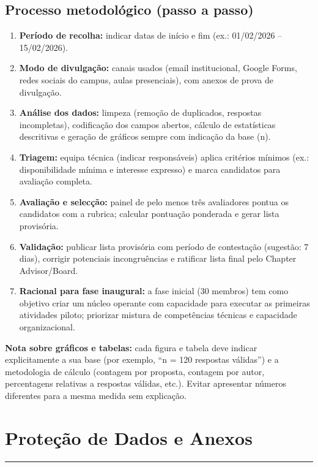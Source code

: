 \documentclass[12pt,a4paper]{article}
\begin{document}
\subsection*{Processo metodológico (passo a passo)}
\begin{enumerate}
    \item \textbf{Período de recolha:} indicar datas de início e fim (ex.: 01/02/2026 -- 15/02/2026).
    \item \textbf{Modo de divulgação:} canais usados (email institucional, Google Forms, redes sociais do campus, aulas presenciais), com anexos de prova de divulgação.
    \item \textbf{Análise dos dados:} limpeza (remoção de duplicados, respostas incompletas), codificação dos campos abertos, cálculo de estatísticas descritivas e geração de gráficos sempre com indicação da base (n).
    \item \textbf{Triagem:} equipa técnica (indicar responsáveis) aplica critérios mínimos (ex.: disponibilidade mínima e interesse expresso) e marca candidatos para avaliação completa.
    \item \textbf{Avaliação e selecção:} painel de pelo menos três avaliadores pontua os candidatos com a rubrica; calcular pontuação ponderada e gerar lista provisória.
    \item \textbf{Validação:} publicar lista provisória com período de contestação (sugestão: 7 dias), corrigir potenciais incongruências e ratificar lista final pelo Chapter Advisor/Board.
    \item \textbf{Racional para fase inaugural:} a fase inicial (30 membros) tem como objetivo criar um núcleo operante com capacidade para executar as primeiras atividades piloto; priorizar mistura de competências técnicas e capacidade organizacional.
\end{enumerate}

\smallskip
\noindent \textbf{Nota sobre gráficos e tabelas:} cada figura e tabela deve indicar explicitamente a sua base (por exemplo, ``n = 120 respostas válidas'') e a metodologia de cálculo (contagem por proposta, contagem por autor, percentagens relativas a respostas válidas, etc.). Evitar apresentar números diferentes para a mesma medida sem explicação.

\section*{Proteção de Dados e Anexos}
\textcolor{spe-secondary}{\rule{\linewidth}{0.5pt}}
\end{document}
